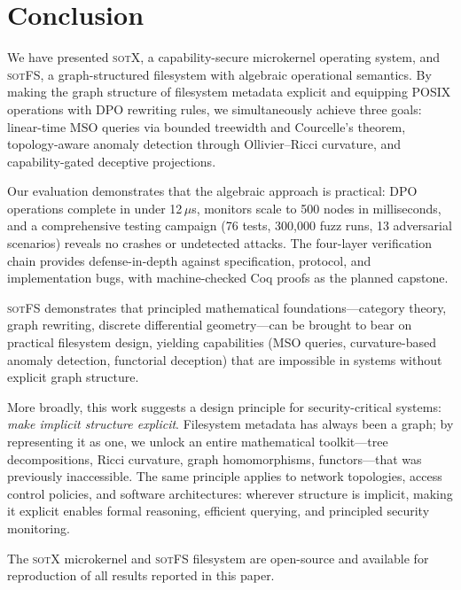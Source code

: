 \documentclass[11pt,a4paper]{article}
\theoremstyle{definition}
\theoremstyle{remark}
\newcommand{\sotfs}{\textsc{sotFS}}
\newcommand{\sotx}{\textsc{sotX}}
\begin{document}
\section{Conclusion}
\label{sec:conclusion}

We have presented \sotx{}, a capability-secure microkernel operating
system, and \sotfs{}, a graph-structured filesystem with algebraic
operational semantics. By making the graph structure of filesystem
metadata explicit and equipping POSIX operations with DPO rewriting
rules, we simultaneously achieve three goals: linear-time MSO queries
via bounded treewidth and Courcelle's theorem, topology-aware anomaly
detection through Ollivier--Ricci curvature, and capability-gated
deceptive projections.

Our evaluation demonstrates that the algebraic approach is practical:
DPO operations complete in under 12\,$\mu$s, monitors scale to 500
nodes in milliseconds, and a comprehensive testing campaign (76 tests,
300{,}000 fuzz runs, 13 adversarial scenarios) reveals no crashes or
undetected attacks. The four-layer verification chain provides
defense-in-depth against specification, protocol, and implementation
bugs, with machine-checked Coq proofs as the planned capstone.

\sotfs{} demonstrates that principled mathematical
foundations---category theory, graph rewriting, discrete differential
geometry---can be brought to bear on practical filesystem design,
yielding capabilities (MSO queries, curvature-based anomaly detection,
functorial deception) that are impossible in systems without explicit
graph structure.

More broadly, this work suggests a design principle for security-critical
systems: \emph{make implicit structure explicit}. Filesystem metadata
has always been a graph; by representing it as one, we unlock an entire
mathematical toolkit---tree decompositions, Ricci curvature, graph
homomorphisms, functors---that was previously inaccessible. The same
principle applies to network topologies, access control policies,
and software architectures: wherever structure is implicit, making it
explicit enables formal reasoning, efficient querying, and principled
security monitoring.

The \sotx{} microkernel and \sotfs{} filesystem are open-source and
available for reproduction of all results reported in this paper.
\end{document}
